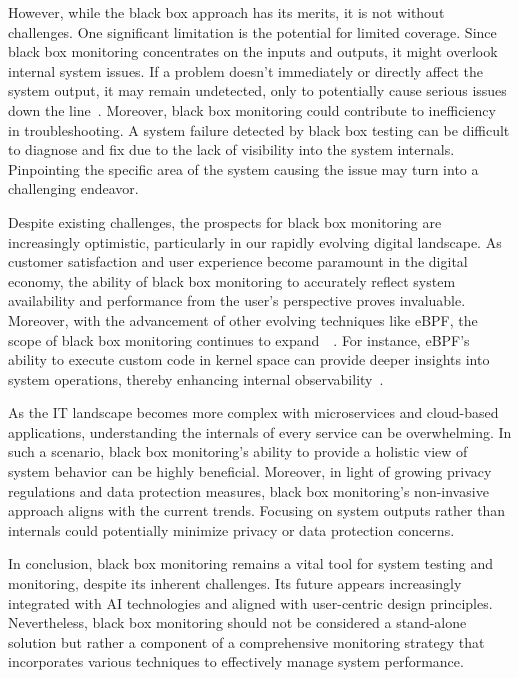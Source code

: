 However, while the black box approach has its merits, it is not without challenges. One significant limitation is the potential for limited coverage. Since black box monitoring concentrates on the inputs and outputs, it might overlook internal system issues. If a problem doesn't immediately or directly affect the system output, it may remain undetected, only to potentially cause serious issues down the line~\parencite{spillnerSoftwareTestingFoundations2021}. Moreover, black box monitoring could contribute to inefficiency in troubleshooting. A system failure detected by black box testing can be difficult to diagnose and fix due to the lack of visibility into the system internals. Pinpointing the specific area of the system causing the issue may turn into a challenging endeavor.

Despite existing challenges, the prospects for black box monitoring are increasingly optimistic, particularly in our rapidly evolving digital landscape. As customer satisfaction and user experience become paramount in the digital economy, the ability of black box monitoring to accurately reflect system availability and performance from the user's perspective proves invaluable. Moreover, with the advancement of other evolving techniques like eBPF, the scope of black box monitoring continues to expand~\parencite{nevesDetailedBlackboxMonitoring2021}~\parencite{brondolinBlackboxMonitoringApproach2020}. For instance, eBPF's ability to execute custom code in kernel space can provide deeper insights into system operations, thereby enhancing internal observability~\parencite{jonathanBPFUniversalInkernel2014}.

As the IT landscape becomes more complex with microservices and cloud-based applications, understanding the internals of every service can be overwhelming. In such a scenario, black box monitoring's ability to provide a holistic view of system behavior can be highly beneficial. Moreover, in light of growing privacy regulations and data protection measures, black box monitoring's non-invasive approach aligns with the current trends. Focusing on system outputs rather than internals could potentially minimize privacy or data protection concerns.

In conclusion, black box monitoring remains a vital tool for system testing and monitoring, despite its inherent challenges. Its future appears increasingly integrated with AI technologies and aligned with user-centric design principles. Nevertheless, black box monitoring should not be considered a stand-alone solution but rather a component of a comprehensive monitoring strategy that incorporates various techniques to effectively manage system performance.

